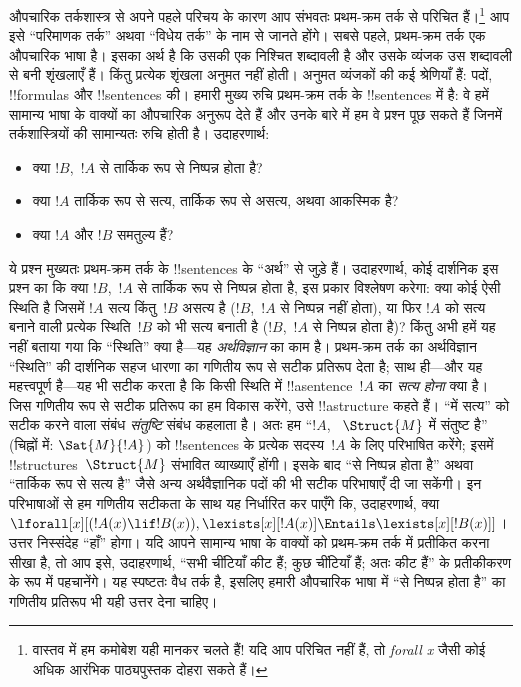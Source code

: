 \documentclass[../../../include/open-logic-section]{subfiles}
\begin{document}


औपचारिक तर्कशास्त्र से अपने पहले परिचय के कारण आप संभवतः प्रथम-क्रम तर्क से
परिचित हैं।\footnote{वास्तव में हम कमोबेश यही मानकर चलते हैं!{} यदि आप
परिचित नहीं हैं, तो \emph{forall x} \citep{Magnus2021} जैसी कोई अधिक
आरंभिक पाठ्यपुस्तक दोहरा सकते हैं।} आप इसे ``परिमाणक तर्क'' अथवा ``विधेय
तर्क'' के नाम से जानते होंगे। सबसे पहले, प्रथम-क्रम तर्क एक औपचारिक भाषा है।
इसका अर्थ है कि उसकी एक निश्चित शब्दावली है और उसके व्यंजक उस शब्दावली से
बनी शृंखलाएँ हैं। किंतु प्रत्येक शृंखला अनुमत नहीं होती। अनुमत व्यंजकों की
कई श्रेणियाँ हैं: पदों, !!{formula}s और !!{sentence}s की। हमारी मुख्य रुचि
प्रथम-क्रम तर्क के !!{sentence}s में है: वे हमें सामान्य भाषा के वाक्यों का
औपचारिक अनुरूप देते हैं और उनके बारे में हम वे प्रश्न पूछ सकते हैं जिनमें
तर्कशास्त्रियों की सामान्यतः रुचि होती है। उदाहरणार्थ:
\begin{itemize}
    \item क्या $!B$,~$!A$ से तार्किक रूप से निष्पन्न होता है?
    \item क्या $!A$ तार्किक रूप से सत्य, तार्किक रूप से असत्य, अथवा
आकस्मिक है?
    \item क्या $!A$ और $!B$ समतुल्य हैं?
\end{itemize}

ये प्रश्न मुख्यतः प्रथम-क्रम तर्क के !!{sentence}s के ``अर्थ'' से जुड़े
हैं। उदाहरणार्थ, कोई दार्शनिक इस प्रश्न का कि क्या $!B$,~$!A$ से तार्किक
रूप से निष्पन्न होता है, इस प्रकार विश्लेषण करेगा: क्या कोई ऐसी स्थिति है
जिसमें $!A$ सत्य किंतु~$!B$ असत्य है ($!B$,~$!A$ से निष्पन्न नहीं होता), या
फिर $!A$ को सत्य बनाने वाली प्रत्येक स्थिति~$!B$ को भी सत्य बनाती है
($!B$,~$!A$ से निष्पन्न होता है)? किंतु अभी हमें यह नहीं बताया गया कि
``स्थिति'' क्या है---यह \emph{अर्थविज्ञान} का काम है। प्रथम-क्रम तर्क का
अर्थविज्ञान ``स्थिति'' की दार्शनिक सहज धारणा का गणितीय रूप से सटीक प्रतिरूप
देता है; साथ ही---और यह महत्त्वपूर्ण है---यह भी सटीक करता है कि किसी स्थिति
  में !!a{sentence}~$!A$ का \emph{सत्य होना} क्या है। जिस गणितीय रूप से सटीक
  प्रतिरूप का हम विकास करेंगे, उसे !!a{structure} कहते हैं। ``में सत्य'' को
  सटीक करने वाला संबंध \emph{संतुष्टि} संबंध कहलाता है। अतः हम ``$!A$,
  ~$\Struct{M}$ में संतुष्ट है'' (चिह्नों में: $\Sat{M}{!A}$) को
  !!{sentence}s के प्रत्येक सदस्य~$!A$ के लिए परिभाषित करेंगे; इसमें
  !!{structure}s~$\Struct{M}$ संभावित व्याख्याएँ होंगी।
  इसके बाद ``से निष्पन्न
होता है'' अथवा ``तार्किक रूप से सत्य है'' जैसे अन्य अर्थवैज्ञानिक पदों की भी
सटीक परिभाषाएँ दी जा सकेंगी। इन परिभाषाओं से हम गणितीय सटीकता के साथ यह
निर्धारित कर पाएँगे कि, उदाहरणार्थ, क्या $\lforall[x][(!A(x) \lif !B(x)),
\lexists[x][!A(x)] \Entails \lexists[x][!B(x)]]$। उत्तर निस्संदेह ``हाँ''
होगा। यदि आपने सामान्य भाषा के वाक्यों को प्रथम-क्रम तर्क में प्रतीकित करना
सीखा है, तो आप इसे, उदाहरणार्थ, ``सभी चींटियाँ कीट हैं; कुछ चींटियाँ हैं; अतः
कीट हैं'' के प्रतीकीकरण के रूप में पहचानेंगे। यह स्पष्टतः वैध तर्क है, इसलिए
हमारी औपचारिक भाषा में ``से निष्पन्न होता है'' का गणितीय प्रतिरूप भी यही
उत्तर देना चाहिए।
\end{document}

